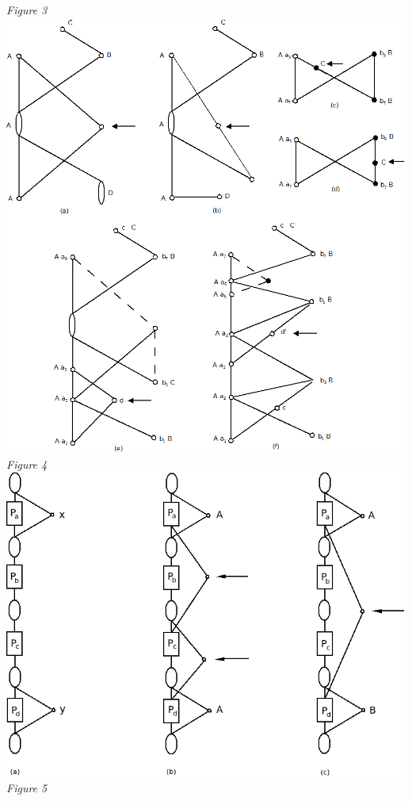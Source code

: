\documentclass[twoside]{article}
\begin{document}
\begin{center}
\textit{Figure 3}\\
\includegraphics[scale=0.4]{figures/Figure4.png}\\
\textit{Figure 4}\\
\vspace{1cm}
\newpage
\includegraphics[scale=0.5]{figures/Figure5.png}\\
\textit{Figure 5}\\
\end{center}
\end{document}
